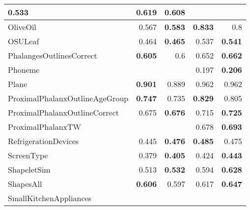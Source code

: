 \begin{longtable}{|l||r|r||r|r|}
0.533 &
\cellcolor[rgb]{ .973,  .796,  .678} \textbf{0.619} &
0.608
\bigstrut\\
\hline
\rowcolor[rgb]{ .851,  .851,  .851} OliveOil &
0.567 &
\cellcolor[rgb]{ .973,  .796,  .678} \textbf{0.583} &
\cellcolor[rgb]{ .973,  .796,  .678} \textbf{0.833} &
0.8
\bigstrut\\
\hline
OSULeaf &
0.464 &
\cellcolor[rgb]{ .973,  .796,  .678} \textbf{0.465} &
0.537 &
\cellcolor[rgb]{ .973,  .796,  .678} \textbf{0.541}
\bigstrut\\
\hline
\rowcolor[rgb]{ .851,  .851,  .851} PhalangesOutlinesCorrect &
\cellcolor[rgb]{ .973,  .796,  .678} \textbf{0.605} &
0.6 &
0.652 &
\cellcolor[rgb]{ .973,  .796,  .678} \textbf{0.662}
\bigstrut\\
\hline
Phoneme &
&
&
0.197 &
\cellcolor[rgb]{ .973,  .796,  .678} \textbf{0.206}
\bigstrut\\
\hline
\rowcolor[rgb]{ .851,  .851,  .851} Plane &
\cellcolor[rgb]{ .973,  .796,  .678} \textbf{0.901} &
0.889 &
0.962 &
0.962
\bigstrut\\
\hline
ProximalPhalanxOutlineAgeGroup &
\cellcolor[rgb]{ .973,  .796,  .678} \textbf{0.747} &
0.735 &
\cellcolor[rgb]{ .973,  .796,  .678} \textbf{0.829} &
0.805
\bigstrut\\
\hline
\rowcolor[rgb]{ .851,  .851,  .851} ProximalPhalanxOutlineCorrect &
0.675 &
\cellcolor[rgb]{ .973,  .796,  .678} \textbf{0.676} &
0.715 &
\cellcolor[rgb]{ .973,  .796,  .678} \textbf{0.725}
\bigstrut\\
\hline
ProximalPhalanxTW &
&
&
0.678 &
\cellcolor[rgb]{ .973,  .796,  .678} \textbf{0.693}
\bigstrut\\
\hline
\rowcolor[rgb]{ .851,  .851,  .851} RefrigerationDevices &
0.445 &
\cellcolor[rgb]{ .973,  .796,  .678} \textbf{0.476} &
\cellcolor[rgb]{ .973,  .796,  .678} \textbf{0.485} &
0.475
\bigstrut\\
\hline
ScreenType &
0.379 &
\cellcolor[rgb]{ .973,  .796,  .678} \textbf{0.405} &
0.424 &
\cellcolor[rgb]{ .973,  .796,  .678} \textbf{0.443}
\bigstrut\\
\hline
\rowcolor[rgb]{ .851,  .851,  .851} ShapeletSim &
0.513 &
\cellcolor[rgb]{ .973,  .796,  .678} \textbf{0.532} &
0.594 &
\cellcolor[rgb]{ .973,  .796,  .678} \textbf{0.628}
\bigstrut\\
\hline
ShapesAll &
\cellcolor[rgb]{ .973,  .796,  .678} \textbf{0.606} &
0.597 &
0.617 &
\cellcolor[rgb]{ .973,  .796,  .678} \textbf{0.647}
\bigstrut\\
\hline
\rowcolor[rgb]{ .851,  .851,  .851} SmallKitchenAppliances &

\end{longtable}
